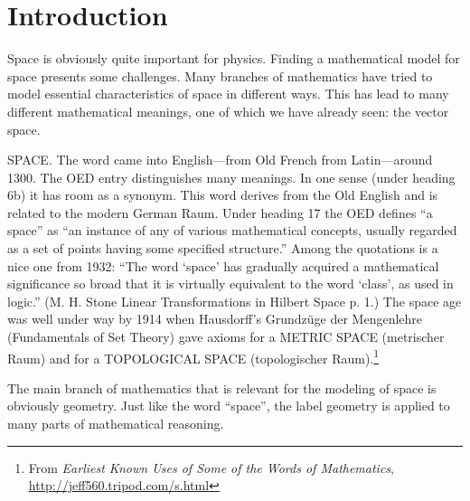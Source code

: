 \chapter{Introduction}
Space is obviously quite important for physics. Finding a mathematical model for space presents some challenges. Many branches of mathematics have tried to model essential characteristics of space in different ways. This has lead to many different mathematical meanings, one of which we have already seen: the vector space.

\begin{displayquote}
SPACE. The word came into English—from Old French from Latin—around 1300. The OED entry distinguishes many meanings. In one sense (under heading 6b) it has room as a synonym. This word derives from the Old English and is related to the modern German Raum. Under heading 17 the OED defines “a space” as “an instance of any of various mathematical concepts, usually regarded as a set of points having some specified structure.” Among the quotations is a nice one from 1932: “The word ‘space’ has gradually acquired a mathematical significance so broad that it is virtually equivalent to the word ‘class’, as used in logic.” (M. H. Stone Linear Transformations in Hilbert Space p. 1.) The space age was well under way by 1914 when Hausdorff’s Grundzüge der Mengenlehre (Fundamentals of Set Theory) gave axioms for a METRIC SPACE (metrischer Raum) and for a TOPOLOGICAL SPACE (topologischer Raum).\footnote{From \textit{Earliest Known Uses of Some of the Words of Mathematics}, \url{http://jeff560.tripod.com/s.html}}
\end{displayquote}

The main branch of mathematics that is relevant for the modeling of space is obviously geometry. Just like the word ``space'', the label geometry is applied to many parts of mathematical reasoning.

